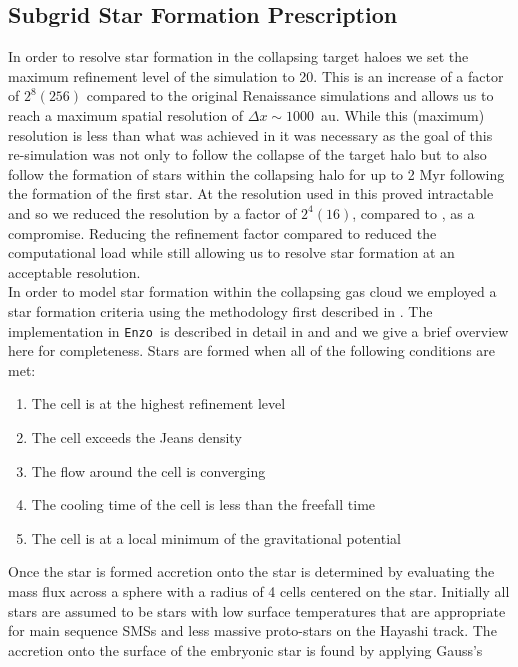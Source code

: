 \documentclass[twocolumn,iop,revtex4]{openjournal}
\newcommand{\enzo}{\texttt{Enzo~}}
\begin{document}
 \subsection{Subgrid Star Formation Prescription} \label{Sec:StarFormation}
 \indent In order to resolve star formation in the collapsing target haloes we set the maximum refinement
 level of the simulation to 20. This is an increase of a factor of $2^8 (256)$ compared to the
 original Renaissance simulations and allows us to reach a maximum spatial resolution of $\Delta x \sim 1000$~au.
 While this (maximum) resolution is less than what was achieved
 in \cite{Wise_2019} it was necessary as the goal of this re-simulation was not only to follow the
 collapse of the target halo but to also follow the formation of stars within the collapsing
 halo for up to 2 Myr following the formation of the first star. At the resolution used in
 \cite{Wise_2019} this proved intractable and so we reduced the
 resolution by a factor of $2^4 (16)$, compared to \cite{Wise_2019}, as a compromise. Reducing the
 refinement factor compared to \cite{Wise_2019} reduced the computational load while still allowing us to
 resolve star formation at an acceptable resolution. \\
 \indent In order to model star formation within the collapsing gas cloud we employed a star
 formation criteria using the methodology first described in \cite{Krumholz_2004}. The implementation
 in \enzo is described in detail in \cite{Regan_2018a} and \cite{Regan_2018b} and we give a
 brief overview here for completeness. Stars are formed when all of the following conditions are met:
\begin{enumerate}
\item The cell is at the highest refinement level
\item The cell exceeds the Jeans density 
\item The flow around the cell is converging 
\item The cooling time of the cell is less than the freefall time
\item The cell is at a local minimum of the gravitational potential
\end{enumerate}
Once the star is formed accretion onto the star is determined by evaluating the mass flux across a
sphere with a radius of 4 cells centered on the star. Initially all stars are assumed to be stars with low surface
temperatures that are appropriate for main sequence SMSs and less massive proto-stars on the
Hayashi track. The accretion onto the surface of the embryonic star is found by applying Gauss's
\end{document}
